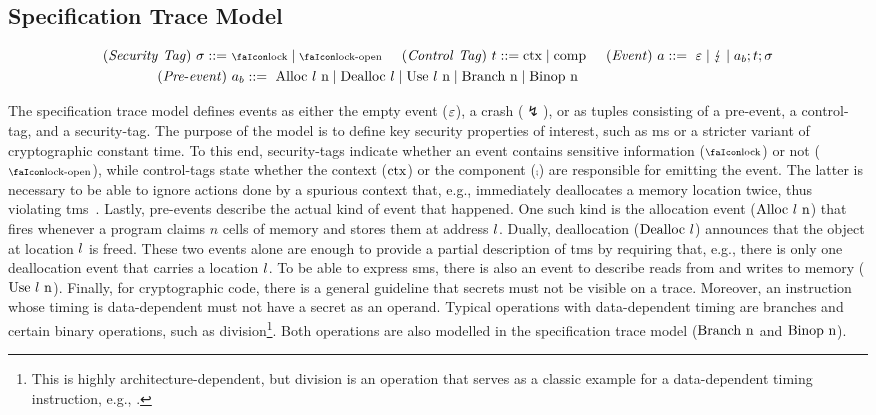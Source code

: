 \documentclass[utf8,acmsmall,review,screen,dvipsnames,anonymous]{acmart}
\begin{document}
\subsection{Specification Trace Model}\label{subsec:propdefs}

\begin{gather*}
  \begin{aligned}
  \mi{(Security\ Tag)}~\sigma\bnfdef&\ \lock \mid \unlock\hspace{0.5cm}
  \mi{(Control\ Tag)}~\sandboxtag\bnfdef \ctx\mid\comp\hspace{0.5cm}
  \mi{(Event)}~\event\bnfdef\ \emptyevent \mid \lightning \mid \event[_{b}];\sandboxtag;\sigma \\
  \mi{(Pre\text{-}event)}&~\event[_{b}]\bnfdef\ \ev{Alloc\ \loc\ n} \mid \ev{Dealloc\ \loc} \mid \ev{Use\ \loc\ n} \mid \ev{Branch\ n} \mid \ev{Binop\ n} \\
  \end{aligned}
\end{gather*}

The specification trace model defines events as either the empty event ($\varepsilon$), a crash ($\lightning$), or as tuples consisting of a pre-event, a control-tag, and a security-tag.
The purpose of the model is to define key security properties of interest, such as \gls{ms} or a stricter variant of cryptographic constant time.
To this end, security-tags indicate whether an event contains sensitive information ($\lock$) or not ($\unlock$), while control-tags state whether the context ($\text{ctx}$) or the component ($\comp$) are responsible for emitting the event.
The latter is necessary to be able to ignore actions done by a spurious context that, e.g., immediately deallocates a memory location twice, thus violating \gls{tms}~\cite{nagarakatte2010cets}.
Lastly, pre-events describe the actual kind of event that happened.
One such kind is the allocation event ($\text{Alloc\ \ensuremath l\ n}$) that fires whenever a program claims $n$ cells of memory and stores them at address $l$.
Dually, deallocation ($\text{Dealloc\ \ensuremath l}$) announces that the object at location $l$ is freed.
These two events alone are enough to provide a partial description of \gls{tms} by requiring that, e.g., there is only one deallocation event that carries a location $l$.
To be able to express \gls{sms}, there is also an event to describe reads from and writes to memory ($\text{Use\ \ensuremath l\ n}$).
Finally, for cryptographic code, there is a general guideline that secrets must not be visible on a trace.
Moreover, an instruction whose timing is data-dependent must not have a secret as an operand.
Typical operations with data-dependent timing are branches and certain binary operations, such as division\footnote{This is highly architecture-dependent, but division is an operation that serves as a classic example for a data-dependent timing instruction, e.g., \cite[p.~755]{arm-refman}.}.
Both operations are also modelled in the specification trace model ($\ev{Branch\ n}$ and $\text{Binop\ n}$).
\end{document}
